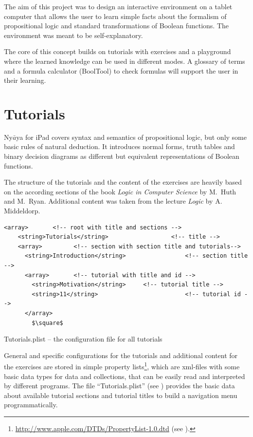 
The aim of this project was to design an interactive environment on a tablet computer 
that allows the user to learn simple facts about the formalism of propositional logic 
and standard transformations of Boolean functions. 
The environment was meant to be self-explanatory. 

The core of this concept builds on tutorials with exercises 
and a playground where the learned knowledge can be used in different modes. 
A glossary of terms and a formula calculator (BoolTool) to check formulas will support the user in their learning.

\section{Tutorials}

Ny$\bar{a}$ya for iPad covers syntax and semantics of propositional logic, 
but only some basic rules of natural deduction. 
It introduces normal forms, truth tables and binary decision diagrams 
as different but equivalent representations of Boolean functions.

The structure of the tutorials and the content of the exercises are heavily based on the according sections of the book  
{\em Logic in Computer Science} \cite{Huth:2004:LCS:975331} by M.~Huth and M.~Ryan.
Additional content was taken from the lecture {\em Logic} \cite{Middeldorp:2012:LICS} by {A. Middeldorp}.


\begin{table}[htdp]
\begin{center}
\begin{lstlisting}[mathescape,firstnumber=5]
  <array> 		<!-- root with title and sections -->
    <string>Tutorials</string> 					<!-- title -->
    <array>			<!-- section with section title and tutorials-->
      <string>Introduction</string> 				<!-- section title -->
      <array>		<!-- tutorial with title and id -->
        <string>Motivation</string> 	<!-- tutorial title -->
        <string>11</string> 						<!-- tutorial id -->
      </array>
		$\square$
\end{lstlisting}
\caption{Tutorials.plist – the configuration file for all tutorials}
\label{tab:TUTORIALPLIST}
\end{center}
\end{table}%

General and specific configurations for the tutorials and additional content for the exercises 
are stored in simple property lists\footnote{
\href{http://www.apple.com/DTDs/PropertyList-1.0.dtd}{http://www.apple.com/DTDs/PropertyList-1.0.dtd}
(see ). }, 
which are xml-files with some basic data types for data and collections, 
that can be easily read and interpreted by different programs.
The file “Tutorials.plist” (see ) 
provides the basic data about available tutorial sections and tutorial titles 
to build a navigation menu programmatically.

